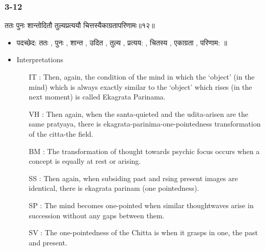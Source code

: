 \begin{frame}[fragile]\frametitle{3-12}
\begin{sanskrit}
ततः पुनः शान्तोदितौ तुल्यप्रत्ययौ चित्तस्यैकाग्रतापरिणामः॥१२॥
\end{sanskrit}

	\begin{itemize}
	\item पदच्छेद: ततः , पुनः , शान्त , उदित , तुल्य , प्रत्यय: , चितस्य , एकाग्रता , परिणाम: ॥
	\item Interpretations
		\begin{itemize}	
		\item [IT]: Then, again, the condition of the mind in which the ‘object’ (in the mind) which is always exactly similar to the ‘object’ which rises (in the next moment) is called Ekagrata Parinama.
		\item [VH]: Then again, when the santa-quieted and the udita-arisen are the same pratyaya, there is ekagrata-parinima-one-pointedness transformation of the citta-the field.
		\item [BM]: The transformation of thought towards psychic focus occurs when a concept is equally at rest or arising.
		\item [SS]: Then again, when subsiding past and rsing present images are identical, there is ekagrata parinam (one pointedness).
		\item [SP]: The mind becomes one-pointed when similar thoughtwaves arise in succession without any gaps between them.
		\item [SV]: The one-pointedness of the Chitta is when it grasps in one, the past and present.
		\end{itemize}
	\end{itemize}
\end{frame}

